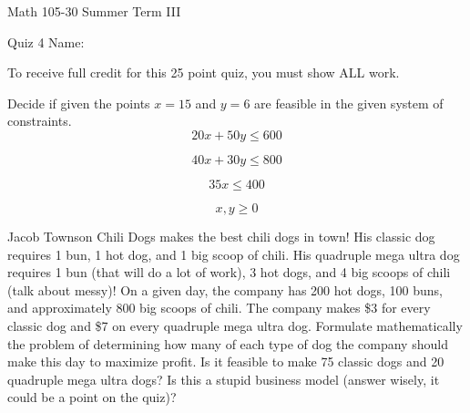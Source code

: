 \documentclass[11pt,epsfig]{article}
\begin{document}
Math 105-30 Summer Term III 

Quiz 4 \hspace{1.9in} {Name:} {\underline {\hspace{3.5in}}}
\vspace{1pc}

To receive full credit for this 25 point quiz, you must show ALL work.
\vspace{1pc}

\begin{problem}{10}
Decide if given the points $x=15$ and $y=6$ are feasible in the given system of constraints. 
\begin{equation*}
20x+50y \leq 600
\end{equation*}

\begin{equation*}
40x+30y \leq 800
\end{equation*}

\begin{equation*}
35x \leq 400
\end{equation*}

\begin{equation*}
x,y \geq 0
\end{equation*}

\vfill
\end{problem}


\newpage

\begin{problem}{15}
Jacob Townson Chili Dogs makes the best chili dogs in town! His classic dog requires 1 bun, 1 hot dog, and 1 big scoop of chili. His quadruple mega ultra dog requires 1 bun (that will do a lot of work), 3 hot dogs, and 4 big scoops of chili (talk about messy)! On a given day, the company has 200 hot dogs, 100 buns, and approximately 800 big scoops of chili. The company makes \$3 for every classic dog and \$7 on every  quadruple mega ultra dog. Formulate mathematically the problem of determining how many of each type of dog the company should make this day to maximize profit. Is it feasible to make 75 classic dogs and 20  quadruple mega ultra dogs? Is this a stupid business model (answer wisely, it could be a point on the quiz)?

\vfill
\end{problem}



\showpoints
\end{document}
